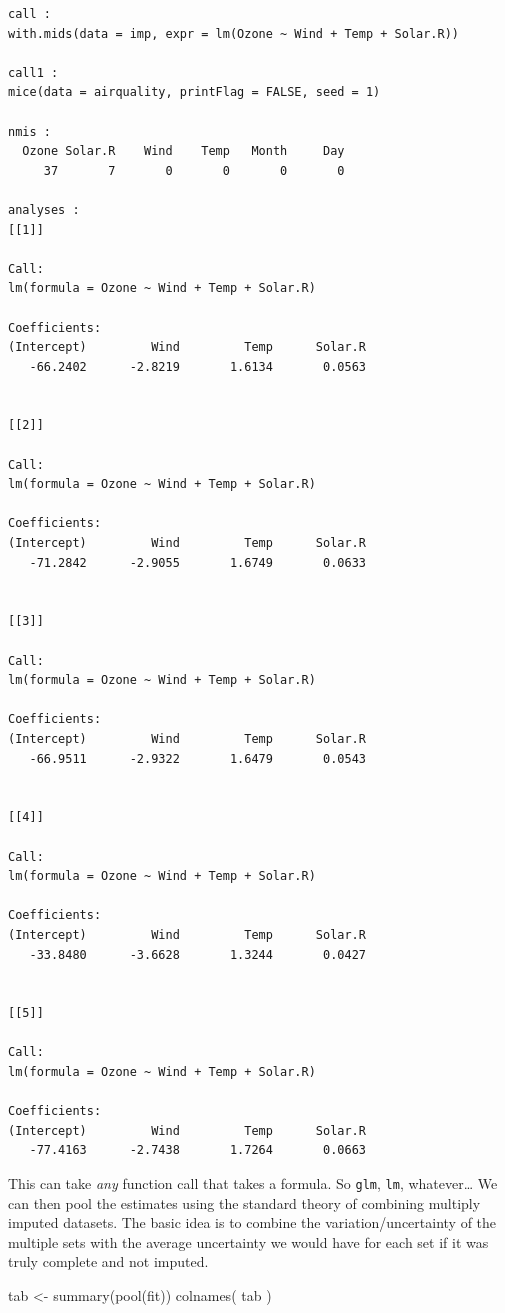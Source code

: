 \documentclass[
  letterpaper,
  DIV=11,
  numbers=noendperiod]{scrreprt}
\newenvironment{Shaded}{\begin{snugshade}}{\end{snugshade}}
\newcommand{\FunctionTok}[1]{\textcolor[rgb]{0.02,0.16,0.49}{#1}}
\newcommand{\NormalTok}[1]{\textcolor[rgb]{0.00,0.44,0.13}{#1}}
\newcommand{\OtherTok}[1]{\textcolor[rgb]{0.00,0.44,0.13}{#1}}
\begin{document}
\begin{verbatim}
call :
with.mids(data = imp, expr = lm(Ozone ~ Wind + Temp + Solar.R))

call1 :
mice(data = airquality, printFlag = FALSE, seed = 1)

nmis :
  Ozone Solar.R    Wind    Temp   Month     Day 
     37       7       0       0       0       0 

analyses :
[[1]]

Call:
lm(formula = Ozone ~ Wind + Temp + Solar.R)

Coefficients:
(Intercept)         Wind         Temp      Solar.R  
   -66.2402      -2.8219       1.6134       0.0563  


[[2]]

Call:
lm(formula = Ozone ~ Wind + Temp + Solar.R)

Coefficients:
(Intercept)         Wind         Temp      Solar.R  
   -71.2842      -2.9055       1.6749       0.0633  


[[3]]

Call:
lm(formula = Ozone ~ Wind + Temp + Solar.R)

Coefficients:
(Intercept)         Wind         Temp      Solar.R  
   -66.9511      -2.9322       1.6479       0.0543  


[[4]]

Call:
lm(formula = Ozone ~ Wind + Temp + Solar.R)

Coefficients:
(Intercept)         Wind         Temp      Solar.R  
   -33.8480      -3.6628       1.3244       0.0427  


[[5]]

Call:
lm(formula = Ozone ~ Wind + Temp + Solar.R)

Coefficients:
(Intercept)         Wind         Temp      Solar.R  
   -77.4163      -2.7438       1.7264       0.0663  
\end{verbatim}

This can take \emph{any} function call that takes a formula. So
\texttt{glm}, \texttt{lm}, whatever\ldots{} We can then pool the
estimates using the standard theory of combining multiply imputed
datasets. The basic idea is to combine the variation/uncertainty of the
multiple sets with the average uncertainty we would have for each set if
it was truly complete and not imputed.

\begin{Shaded}
\begin{Highlighting}[]
\NormalTok{  tab }\OtherTok{\textless{}{-}} \FunctionTok{summary}\NormalTok{(}\FunctionTok{pool}\NormalTok{(fit))}
  \FunctionTok{colnames}\NormalTok{( tab )}
\end{Highlighting}
\end{Shaded}
\end{document}
